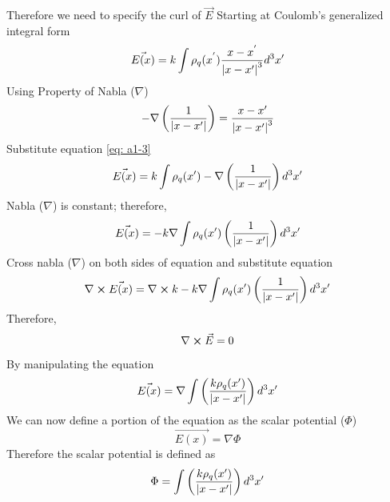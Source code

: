 \documentclass[12pt]{article}
\begin{document}
        \newline Therefore we need to specify the curl of $\vec{E}$
        \newline Starting at Coulomb's generalized integral form 
        \begin{gather*}
            \vec{E(x)}= k \int \rho_q(x^{'}) \frac{x-x^{'}}{\abs{x - x'}^3}d^3x'
        \end{gather*}
        \newline Using Property of Nabla ($\nabla$)
        \begin{equation} \label{eq: a1-6}
            -\nabla \left(\frac{1}{\abs{x-x'}} \right) = \frac{x-x'}{\abs{x - x'}^3}
        \end{equation}
        Substitute equation \ref{eq: a1-3}
        \begin{equation} \label{eq: a1-7}
            \vec{E(x)}= k \int \rho_q(x') -\nabla \left(\frac{1}{\abs{x-x'}} \right) d^3x'
        \end{equation}
        Nabla ($\nabla$) is constant; therefore,
        \begin{equation} \label{eq: a1-8}
            \vec{E(x)}= -k \nabla \int \rho_q(x') \left(\frac{1}{\abs{x-x'}} \right) d^3x'
        \end{equation}
        Cross nabla ($\nabla$) on both sides of equation and substitute equation
        \begin{equation} \label{eq: a1-9}
            \nabla \cross \vec{E(x)}= \nabla \cross k -k\nabla \int \rho_q(x') \left(\frac{1}{\abs{x-x'}} \right) d^3x'
        \end{equation}
        Therefore,
        \begin{equation} \label{eq: a1-10}
            \nabla \cross \vec{E} = 0
        \end{equation}
        By manipulating the equation 
        \begin{equation} \label{eq: a1-10}
            \vec{E(x)}= \nabla \int \left(\frac{k \rho_q (x')}{\abs{x-x'}} \right) d^3x'
        \end{equation}
        We can now define a portion of the equation as the scalar potential ($\Phi$)
        \begin{equation} \label{eq: a1-11}
            \vec{E(x)}= \nabla \Phi
        \end{equation}
        Therefore the scalar potential is defined as 
        \begin{equation} \label{eq: a1-12}
            \Phi = \int \left(\frac{k \rho_q (x')}{\abs{x-x'}} \right) d^3x'
        \end{equation}
\end{document}
